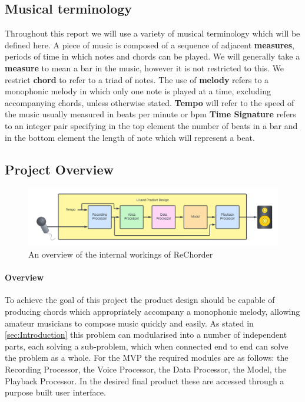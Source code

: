 \subsection{Musical terminology}

Throughout this report we will use a variety of musical terminology which will be defined here. A piece of music is composed of a sequence of adjacent \textbf{measures}, periods of time in which notes and chords can be played. 
We will generally take a \textbf{measure} to mean a bar in the music, however it is not restricted to this. We restrict \textbf{chord} to refer to a triad of notes.%
 The use of \textbf{melody} refers to a monophonic melody in which only one note is played at a time, excluding accompanying chords, unless otherwise stated.
\textbf{Tempo} will refer to the speed of the music usually measured in beats per minute or bpm
\textbf{Time Signature} refers to an integer pair specifying in the top element the number of beats in a bar and in the bottom element the length of note which will represent a beat.


\subsection{Project Overview}
\begin{figure}
    \centering
    \includegraphics[width=0.8\columnwidth]{Figures/Project Overview}
    \decoRule
    \caption[]{An overview of the internal workings of ReChorder}
    \label{fig:MVPOverview}
\end{figure}

\paragraph{Overview}
To achieve the goal of this project the product design should be capable of producing chords which appropriately accompany a monophonic melody, allowing amateur musicians to compose music quickly and easily.
As stated in \ref{sec:Introduction} this problem can modularised into a number of independent parts, each solving a sub-problem, which when connected end to end can solve the problem as a whole.
For the MVP the required modules are as follows: the Recording Processor, the Voice Processor, the Data Processor, the Model, the Playback Processor.
In the desired final product these are accessed through a purpose built user interface.

